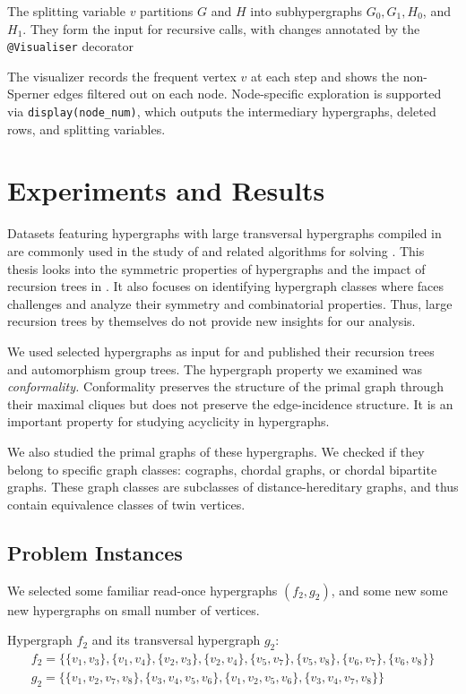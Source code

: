 The splitting variable $v$ partitions $G$ and $H$ into subhypergraphs $G_0,G_1,H_0$, and $H_1$. They form the input for recursive calls, with changes annotated by the \texttt{@Visualiser} decorator

The visualizer records the frequent vertex $v$ at each step and shows the non-Sperner edges filtered out on each node. Node-specific exploration is supported via \texttt{display(node\_num)}, which outputs the intermediary hypergraphs, deleted rows, and splitting variables.

\section{Experiments and Results}

Datasets featuring hypergraphs with large transversal hypergraphs compiled in \cite{Uno24} are commonly used in the study of \FKA{} and related algorithms for solving \TransHyp{} \cite{missing-2, Tak08}. This thesis looks into the symmetric properties of hypergraphs and the impact of recursion trees in \FKA. It also focuses on identifying hypergraph classes where \FKA{} faces challenges and analyze their symmetry and combinatorial properties. Thus, large recursion trees by themselves do not provide new insights for our analysis.

We used selected hypergraphs as input for \FKA{} and published their recursion trees and automorphism group trees. The hypergraph property we examined was \emph{conformality.} Conformality preserves the structure of the primal graph through their maximal cliques but does not preserve the edge-incidence structure. It is an important property for studying acyclicity in hypergraphs.

We also studied the primal graphs of these hypergraphs. We checked if they belong to specific graph classes: cographs, chordal graphs, or chordal bipartite graphs. These graph classes are subclasses of distance-hereditary graphs, and thus contain equivalence classes of twin vertices.

\subsection{Problem Instances}

We selected some familiar read-once hypergraphs $(f_2,g_2)$, and some new some new hypergraphs on small number of vertices.

Hypergraph $f_2$ and its transversal hypergraph $g_2$:
\begin{gather*}
f_2=\{\{v_1,v_3\},\{v_1,v_4\},\{v_2,v_3\},\{v_2,v_4\},\{v_5,v_7\},\{v_5,v_8\},\{v_6,v_7\},\{v_6,v_8\}\}\\[4pt]
g_2=\{\{v_1,v_2,v_7,v_8\},\{v_3,v_4,v_5,v_6\},\{v_1,v_2,v_5,v_6\},\{v_3,v_4,v_7,v_8\}\}
\end{gather*}

